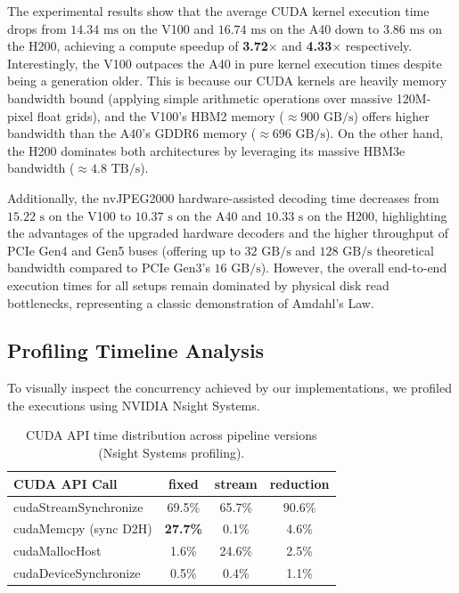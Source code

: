 \documentclass[10pt,conference,compsoc]{IEEEtran}
\begin{document}
The experimental results show that the average CUDA kernel execution time drops from $14.34\text{ ms}$ on the V100 and $16.74\text{ ms}$ on the A40 down to $3.86\text{ ms}$ on the H200, achieving a compute speedup of \textbf{3.72$\times$} and \textbf{4.33$\times$} respectively. Interestingly, the V100 outpaces the A40 in pure kernel execution times despite being a generation older. This is because our CUDA kernels are heavily memory bandwidth bound (applying simple arithmetic operations over massive 120M-pixel float grids), and the V100's HBM2 memory ($\approx 900\text{ GB/s}$) offers higher bandwidth than the A40's GDDR6 memory ($\approx 696\text{ GB/s}$). On the other hand, the H200 dominates both architectures by leveraging its massive HBM3e bandwidth ($\approx 4.8\text{ TB/s}$).

Additionally, the nvJPEG2000 hardware-assisted decoding time decreases from $15.22\text{ s}$ on the V100 to $10.37\text{ s}$ on the A40 and $10.33\text{ s}$ on the H200, highlighting the advantages of the upgraded hardware decoders and the higher throughput of PCIe Gen4 and Gen5 buses (offering up to $32\text{ GB/s}$ and $128\text{ GB/s}$ theoretical bandwidth compared to PCIe Gen3's $16\text{ GB/s}$). However, the overall end-to-end execution times for all setups remain dominated by physical disk read bottlenecks, representing a classic demonstration of Amdahl's Law.




\subsection{Profiling Timeline Analysis}
To visually inspect the concurrency achieved by our implementations, we profiled the executions using NVIDIA Nsight Systems. 

\begin{table}[h]
\centering
\begin{tabular}{lccc}
\hline
\textbf{CUDA API Call} & \textbf{fixed} & \textbf{stream} & \textbf{reduction} \\ \hline
cudaStreamSynchronize & 69.5\% & 65.7\% & 90.6\% \\
cudaMemcpy (sync D2H) & \textbf{27.7\%} & 0.1\% & 4.6\% \\
cudaMallocHost & 1.6\% & 24.6\% & 2.5\% \\
cudaDeviceSynchronize & 0.5\% & 0.4\% & 1.1\% \\
\hline
\end{tabular}
\caption{CUDA API time distribution across pipeline versions (Nsight Systems profiling).}
\label{tab:cuda_api_profiling}
\end{table}
\end{document}
